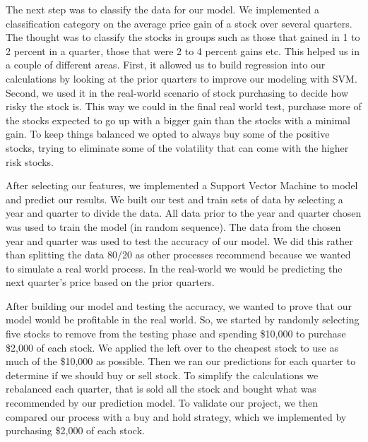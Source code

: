 \documentclass[conference]{IEEEtran}
\begin{document}
The next step was to classify the data for our model. We implemented a classification category on the average price gain of a stock over several quarters.  The thought was to classify the stocks in groups such as those that gained in 1 to 2 percent in a quarter, those that were 2 to 4 percent gains etc. This helped us in a couple of different areas.  First, it allowed us to build regression into our calculations by looking at the prior quarters to improve our modeling with SVM.  Second, we used it in the real-world scenario of stock purchasing to decide how risky the stock is. This way we could in the final real world test, purchase more of the stocks expected to go up with a bigger gain than the stocks with a minimal gain.  To keep things balanced we opted to always buy some of the positive stocks, trying to eliminate some of the volatility that can come with the higher risk stocks.

After selecting our features, we implemented a Support Vector Machine to model and predict our results.  We built our test and train sets of data by selecting a year and quarter to divide the data.  All data prior to the year and quarter chosen was used to train the model (in random sequence). The data from the chosen year and quarter was used to test the accuracy of our model.  We did this rather than splitting the data 80/20 as other processes recommend because we wanted to simulate a real world process.  In the real-world we would be predicting the next quarter's price based on the prior quarters.  

After building our model and testing the accuracy, we wanted to prove that our model would be profitable in the real world.  So, we started by randomly selecting five stocks to remove from the testing phase and spending \$10,000 to purchase \$2,000 of each stock.  We applied the left over to the cheapest stock to use as much of the \$10,000 as possible. Then we ran our predictions for each quarter to determine if we should buy or sell stock.  To simplify the calculations we rebalanced each quarter, that is sold all the stock and bought what was recommended by our prediction model.  To validate our project, we then compared our process with a buy and hold strategy, which we implemented by purchasing \$2,000 of each stock.
\end{document}
